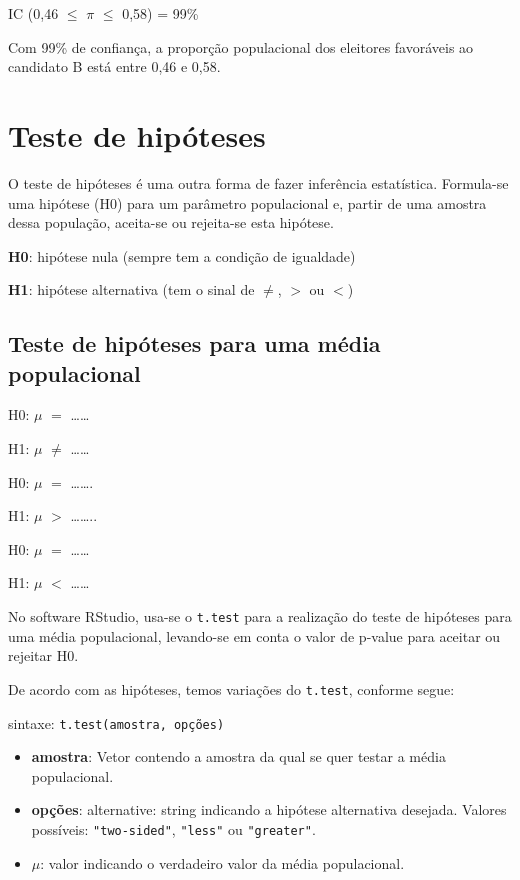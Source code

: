 \documentclass[12pt,brazil,oneside]{book}
\providecommand{\tightlist}{%
  \setlength{\itemsep}{0pt}\setlength{\parskip}{0pt}}
\begin{document}
IC (0,46 \(\leq\) \(\pi\) \(\leq\) 0,58) = 99\%

Com 99\% de confiança, a proporção populacional dos eleitores favoráveis
ao candidato B está entre 0,46 e 0,58.

\hypertarget{teste-de-hipoteses}{%
\section{Teste de hipóteses}\label{teste-de-hipoteses}}

O teste de hipóteses é uma outra forma de fazer inferência estatística.
Formula-se uma hipótese (H0) para um parâmetro populacional e, partir de
uma amostra dessa população, aceita-se ou rejeita-se esta hipótese.

\textbf{H0}: hipótese nula (sempre tem a condição de igualdade)

\textbf{H1}: hipótese alternativa (tem o sinal de \(\neq\), \(>\) ou
\(<\))

\hypertarget{teste-de-hipoteses-para-uma-media-populacional}{%
\subsection{Teste de hipóteses para uma média
populacional}\label{teste-de-hipoteses-para-uma-media-populacional}}

H0: \(\mu\) \(=\) \ldots{}\ldots{}

H1: \(\mu\) \(\neq\) \ldots{}\ldots{}

H0: \(\mu\) \(=\) \ldots{}\ldots{}.

H1: \(\mu\) \(>\) \ldots{}\ldots{}..

H0: \(\mu\) \(=\) \ldots{}\ldots{}

H1: \(\mu\) \(<\) \ldots{}\ldots{}

No software RStudio, usa-se o \texttt{t.test} para a realização do teste
de hipóteses para uma média populacional, levando-se em conta o valor de
p-value para aceitar ou rejeitar H0.

De acordo com as hipóteses, temos variações do \texttt{t.test}, conforme
segue:

sintaxe: \texttt{t.test(amostra,\ opções)}

\begin{itemize}
\tightlist
\item
  \textbf{amostra}: Vetor contendo a amostra da qual se quer testar a
  média populacional.
\item
  \textbf{opções}: alternative: string indicando a hipótese alternativa
  desejada. Valores possíveis: \texttt{"two-sided"}, \texttt{"less"} ou
  \texttt{"greater"}.
\item
  \(\mu\): valor indicando o verdadeiro valor da média populacional.
\end{itemize}
\end{document}
